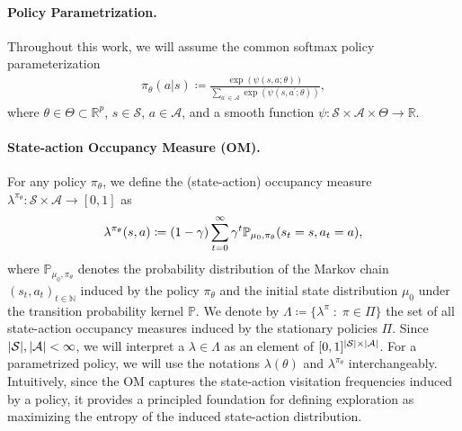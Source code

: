 \documentclass{article}
\theoremstyle{plain}
\theoremstyle{definition}
\theoremstyle{remark}
\def\RR{{\mathbb{R}}}
\def\PP{{\mathbb{P}}}
\def\NN{{\mathbb{N}}}
\def\SS{{\mathcal{S}}}
\def\AA{{\mathcal{A}}}
\DeclarePairedDelimiter{\paren}{(}{)}
\DeclarePairedDelimiter{\abs}{\lvert}{\rvert}
\newcommand{\define}{\coloneqq}
\def\ss{{s}}
\def\NN{{\mathbb{N}}}
\def\aa{{a}}
\def\ss{{s}}
\begin{document}
\paragraph{Policy Parametrization.} Throughout this work, we will assume the common softmax policy
parameterization
\begin{align*}
 \pi_\theta(\aa \vert \ss) \define \frac{\exp(\psi(\ss, \aa; \theta))}{
  \sum_{\aa^\prime \in \AA}\exp(\psi(\ss, \aa^\prime; \theta))
 },
\end{align*}
where $\theta \in \Theta \subset \RR^p$, $\ss \in \SS$, $\aa \in \AA$, and
a smooth function $\psi:\SS\times \AA \times \Theta \to \RR$.
\paragraph{State-action Occupancy Measure (OM).}
For any policy $\pi_\theta$, we define the (state-action) occupancy measure
$\lambda^{\pi_\theta}: \SS \times \AA \to [0,1]$ as
\begin{align*}
 \lambda^{\pi_\theta}(\ss, \aa)
 \define (1-\gamma)\sum_{t=0}^{\infty} \gamma^t \PP_{\mu_0,
  \pi_{\theta}}\paren{\ss_t = \ss, \aa_t = \aa},
\end{align*}
where $\PP_{\mu_0, \pi_{\theta}}$ denotes the probability distribution of the
Markov chain $(\ss_t, \aa_t)_{t\in \NN}$ induced by the policy $\pi_\theta$
and the initial state distribution $\mu_0$ under the transition probability
kernel $\PP$. We denote by
$\Lambda \define \{\lambda^{\pi} \; : \; \pi \in \Pi\}$
the set of all state-action occupancy measures induced by the stationary policies
$\Pi$.
Since $\abs{\SS}, \abs{\AA} < \infty$, we will interpret a $\lambda \in \Lambda$
as an element of $[0,1]^{\abs{\SS} \times \abs{\AA}}$. For a parametrized
policy, we will use the notations $\lambda(\theta)$ and $\lambda^{\pi_{\theta}}$
interchangeably.
Intuitively, since the OM captures the state-action visitation frequencies
induced by a policy, it provides a principled foundation for defining
exploration as maximizing the entropy of the induced state-action
distribution.
\end{document}

